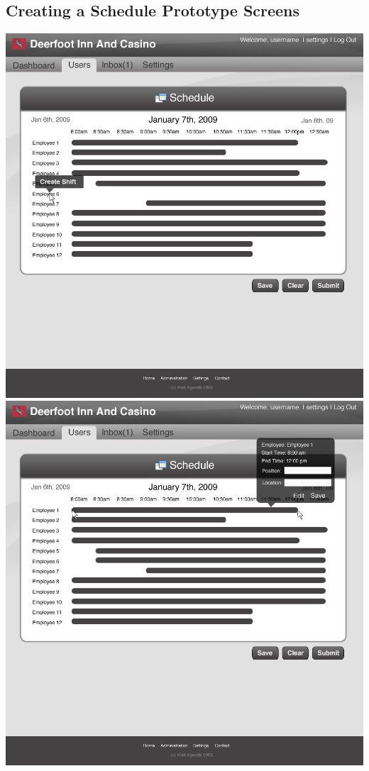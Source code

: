 \documentclass[letterpaper,12pt]{report}
\begin{document}
\begin{landscape}
\section{Creating a Schedule Prototype Screens}
\begin{center}
 \includegraphics[scale=0.3]{prototypes/createScheduleClickEmp.jpg}
 \includegraphics[scale=0.3]{prototypes/createSchedDrag.jpg}
\end{center}


\end{landscape}
\end{document}
